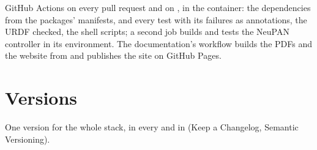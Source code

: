 GitHub Actions on every pull request and on , in the 
container: the dependencies from the packages' manifests,  and every test with
its failures as annotations, the URDF checked, the shell scripts; a second job builds and tests
the NeuPAN controller in its environment. The documentation's workflow builds the PDFs and the
website from  and publishes the site on GitHub Pages.

\section{Versions}

One version for the whole stack, in every  and in  (Keep a
Changelog, Semantic Versioning).
